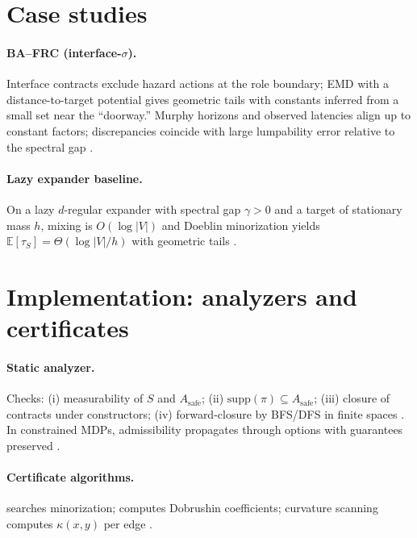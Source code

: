 \documentclass[11pt]{article}
\newcommand{\E}{\mathbb{E}}
\newcommand{\supp}{\mathrm{supp}}
\newcommand{\1}{\mathbbm{1}}
\begin{document}
\section{Case studies}\label{sec:cases}
\paragraph{BA--FRC (interface-$\sigma$).}
Interface contracts exclude hazard actions at the role boundary; EMD with a distance-to-target potential gives geometric tails with constants inferred from a small set near the “doorway.” Murphy horizons and observed latencies align up to constant factors; discrepancies coincide with large lumpability error relative to the spectral gap \parencite{elliott2025bafrc,elliott2025qfi,LevinPeresWilmer2009}.

\paragraph{Lazy expander baseline.}
On a lazy $d$-regular expander with spectral gap $\gamma>0$ and a target of stationary mass $h$, mixing is $O(\log|V|)$ and Doeblin minorization yields $\E[\tau_S]=\Theta(\log|V|/h)$ with geometric tails \parencite{HooryLinialWigderson2006,LevinPeresWilmer2009}.

\section{Implementation: analyzers and certificates}\label{sec:impl}
\paragraph{Static analyzer.}
Checks: (i) measurability of $S$ and $A_{\text{safe}}$; (ii) $\supp(\pi)\subseteq A_{\text{safe}}$; (iii) closure of contracts under constructors; (iv) forward-closure by BFS/DFS in finite spaces \parencite{Cormen2009}. In constrained MDPs, admissibility propagates through options with guarantees preserved \parencite{Puterman1994,Altman1999}.

\paragraph{Certificate algorithms.}
 searches minorization;  computes Dobrushin coefficients; curvature scanning computes $\kappa(x,y)$ per edge \parencite{Ollivier2009}.
\end{document}
